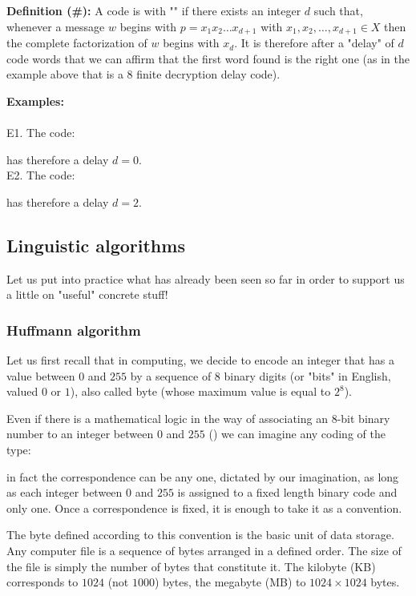 	\pagebreak
	\textbf{Definition (\#\mydef):} A code is with "" if there exists an integer $d$ such that, whenever a message $w$ begins with $p=x_1x_2\ldots x_{d+1}$ with $x_1,x_2,\ldots, x_{d+1}\in X$ then the complete factorization of $w$ begins with $x_d$. It is therefore after a "delay" of $d$ code words that we can affirm that the first word found is the right one (as in the example above that is a $8$ finite decryption delay code).
	\begin{tcolorbox}[colframe=black,colback=white,sharp corners]
	\textbf{{\Large {}}Examples:}\\\\	
	E1. The code:
	
	has therefore a delay $d=0$.\\

	E2. The code:
	
	has therefore a delay $d=2$.
	\end{tcolorbox}
	
	\subsection{Linguistic algorithms}
	Let us put into practice what has already been seen so far in order to support us a little on "useful" concrete stuff!
	
	\subsubsection{Huffmann algorithm}
	Let us first recall that in computing, we decide to encode an integer that has a value between $0$ and $255$ by a sequence of $8$ binary digits (or "bits" in English, valued $0$ or $1$), also called byte (whose maximum value is equal to $2^8$).
	
	Even if there is a mathematical logic in the way of associating an $8$-bit binary number to an integer between $0$ and $255$ () we can imagine any coding of the type:
	
	in fact the correspondence can be any one, dictated by our imagination, as long as each integer between $0$ and $255$ is assigned to a fixed length binary code and only one. Once a correspondence is fixed, it is enough to take it as a convention.
	
	The byte defined according to this convention is the basic unit of data storage. Any computer file is a sequence of bytes arranged in a defined order. The size of the file is simply the number of bytes that constitute it. The kilobyte (KB) corresponds to $1024$ (not $1000$) bytes, the megabyte (MB) to $1024\times 1024$ bytes.

